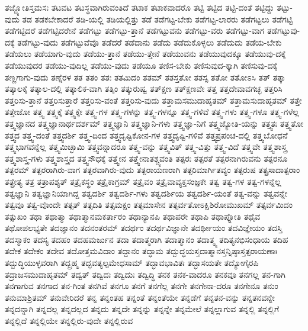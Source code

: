 {ತಜ್ಜ್ಯೋತಿಸ್ತಮಸಃ
ತಟವಟ
ತಟಸ್ಥವಾಗಿರುವಂತಿದೆ
ತಟಾಕ
ತಟಾಕವಾದರೊ
ತಟ್ಟಿ
ತಟ್ಟಿದ
ತಟ್ಟಿ-ದಂತೆ
ತಟ್ಟಿದ್ದು
ತಟ್ಟು-ವುದು
ತಡ
ತಡಕಬೇಕಾದರೆ
ತಡಿ-ಯಲ್ಲಿ
ತಡಿಯಲ್ಲಿತ್ತು
ತಡೆ
ತಡೆಗಟ್ಟ-ಬೇಕು
ತಡೆಗಟ್ಟ-ಲಾರರು
ತಡೆಗಟ್ಟಲು
ತಡೆಗಟ್ಟಿ
ತಡೆಗಟ್ಟಿದರೆ
ತಡೆಗಟ್ಟಿದರೇನೆ
ತಡೆಗಟ್ಟು
ತಡೆಗಟ್ಟು-ತ್ತಾನೆ
ತಡೆಗಟ್ಟುವನು
ತಡೆಗಟ್ಟು-ವರು
ತಡೆಗಟ್ಟು-ವಾಗ
ತಡೆಗಟ್ಟುವು-ದಕ್ಕೆ
ತಡೆಗಟ್ಟು-ವುದು
ತಡೆಗಟ್ಟುವೆವೊ
ತಡೆದರೆ
ತಡೆದಾನು
ತಡೆದು
ತಡೆದುಕೊಳ್ಳಲು
ತಡೆದುದು
ತಡೆಯ-ಬೇಕು
ತಡೆಯಲು
ತಡೆಯಾಗು-ವುದು
ತಡೆಯು-ತ್ತಾನೆ
ತಡೆಯು-ತ್ತೇನೆ
ತಡೆಯುವನು
ತಡೆಯುವುದಕ್ಕೂ
ತಡೆಯುವು-ದಕ್ಕೆ
ತಡೆಯುವುದರ
ತಡೆಯು-ವುದಿಲ್ಲ
ತಡೆಯು-ವುದು
ತಡೆಯೂ
ತಣಿಸ-ಬೇಕು
ತಣಿಸುವುದ-ಕ್ಕಾಗಿ
ತಣಿಸುವು-ದಕ್ಕೆ
ತಣ್ಣಗಾಗು-ವುದು
ತಣ್ನೆರಳ
ತತ
ತತಂ
ತತಃ
ತತಮಿದಂ
ತತಮ್
ತತಸ್ತತೋ
ತತಸ್ಸ
ತತೋ
ತತೋಽಸಿ
ತತ್
ತತ್ಕಾ
ತತ್ಕಾಲಕ್ಕೆ
ತತ್ಕಾಲ-ದಲ್ಲಿ
ತತ್ಕಾಲಿಕ-ವಾಗಿ
ತತ್ಕಿಂ
ತತ್ಕುರುಷ್ವ
ತತ್ಕ್ಷಣ
ತತ್ಕ್ಷಣವೇ
ತತ್ತ
ತತ್ತದೇವಾವಗಚ್ಛ
ತತ್ತರಿಸಿ
ತತ್ತರಿಸು-ತ್ತಾನೆ
ತತ್ತರಿಸುತ್ತಾರೆ
ತತ್ತರಿಸು-ವಂತೆ
ತತ್ತರಿಸು-ವುದು
ತತ್ತಾಮಸಮುದಾಹೃತಮ್
ತತ್ತಾಮಸುದಾಹೃತಮ್
ತತ್ತೇ
ತತ್ತೇಜೋ
ತತ್ತ್ವ
ತತ್ತ್ವಕ್ಕೆ
ತತ್ತ್ವಕ್ಕೇ
ತತ್ತ್ವ-ಗಳ
ತತ್ತ್ವ-ಗಳನ್ನು
ತತ್ತ್ವ-ಗಳನ್ನೂ
ತತ್ತ್ವ-ಗಳಿವೆ
ತತ್ತ್ವ-ಗಳು
ತತ್ತ್ವ-ಗಳೂ
ತತ್ತ್ವ-ಗಳೆಲ್ಲ
ತತ್ತ್ವಜ್ಞಾನದ
ತತ್ತ್ವಜ್ಞಾನಾರ್ಥದರ್ಶಮ್
ತತ್ತ್ವಜ್ಞಾನಿ
ತತ್ತ್ವಜ್ಞಾನಿ-ಗಳು
ತತ್ತ್ವಜ್ಞಾ-ನಿಗೆ
ತತ್ತ್ವಜ್ಯೋತಿ-ಯನ್ನು
ತತ್ತ್ವತಃ
ತತ್ತ್ವತೋ
ತತ್ತ್ವದ
ತತ್ತ್ವ-ದಂತೆ
ತತ್ತ್ವದರ್ಶಿ
ತತ್ತ್ವ-ದಿಂದ
ತತ್ತ್ವದೃಷ್ಟಿಕೋನ-ಗಳ
ತತ್ತ್ವದೃಷ್ಟಿ-ಗಳಿವೆ
ತತ್ತ್ವಪ್ರಪಂಚ-ದಲ್ಲಿ
ತತ್ತ್ವಬೋಧನೆ
ತತ್ತ್ವಭಾಗವನ್ನೆಲ್ಲ
ತತ್ತ್ವಮಿಚ್ಛಾಮಿ
ತತ್ತ್ವವನ್ನಾದರೂ
ತತ್ತ್ವ-ವನ್ನು
ತತ್ತ್ವವಿತ್
ತತ್ತ್ವ-ವಿತ್ತು
ತತ್ತ್ವ-ವಿದೆ
ತತ್ತ್ವವೇ
ತತ್ತ್ವಶಾಸ್ತ್ರ
ತತ್ತ್ವಶಾಸ್ತ್ರ-ಗಳು
ತತ್ತ್ವಶಾಸ್ತ್ರದ
ತತ್ತ್ವಸೌಧಕ್ಕೆ
ತತ್ತ್ವೇನ
ತತ್ತ್ವೇನಾತಶ್ಚ್ಯವಂತಿ
ತತ್ಪರಃ
ತತ್ಪರತೆ
ತತ್ಪರನಾಗಿರುವನು
ತತ್ಪರನೂ
ತತ್ಪರಮ್
ತತ್ಪರರಾಗಿರು-ವಾಗ
ತತ್ಪರವಾಗಿರು-ವುದು
ತತ್ಪರಾಯಣರಾಗಿ
ತತ್ಪರಿಮಾರ್ಗಿತವ್ಯಂ
ತತ್ಪರುಷ
ತತ್ಪ್ರಸಾದಾತ್ಪರಾಂ
ತತ್ಪ್ರೇತ್ಯ
ತತ್ರ
ತತ್ರಾಪಶ್ಯತ್
ತತ್ರೈಕಸ್ಥಂ
ತತ್ರೈಕಾಗ್ರಮ್
ತತ್ರೈವಂ
ತತ್ರೈವಾವ್ಯಕ್ತಸಂಜ್ಞಕೇ
ತತ್ವ
ತತ್ವ-ಗಳ
ತತ್ವ-ಗಳನ್ನೆಲ್ಲ
ತತ್ವಜ್ಞಾನಿ
ತತ್ವಜ್ಞಾನಿಯಾಗಿದ್ದ
ತತ್ವದರ್ಶಿ
ತತ್ವದರ್ಶಿ-ಗಳು
ತತ್ವದರ್ಶಿಯ
ತತ್ವದರ್ಶಿ-ಯಂತೆ
ತತ್ವ-ವನ್ನು
ತತ್ವವನ್ನೇ
ತತ್ವವೂ
ತತ್ವ-ವೊಂದೇ
ತತ್ಸತ್
ತತ್ಸದಿತಿ
ತತ್ಸಮಕ್ಷಂ
ತತ್ಸಮಾಸೇನ
ತತ್ಸರ್ವತೋಽಕ್ಷಿಶಿರೋಮುಖಮ್
ತತ್ಸರ್ವಮಿದಂ
ತತ್ಸುಖಂ
ತಥಾ
ತಥಾತ್ಮಾ
ತಥಾತ್ಮಾನಮಕರ್ತಾರಂ
ತಥಾನ್ಯಾನಪಿ
ತಥಾಪರೇ
ತಥಾಪಿ
ತಥಾಪ್ನೋತಿ
ತಥೈವ
ತಥೋಪಲಭ್ಯತೇ
ತದಜ್ಞಾನಂ
ತದನಂತರಮ್
ತದರ್ಥಂ
ತದರ್ಥವಿಜ್ಞಾನೇ
ತದರ್ಥೀಯಂ
ತದವಿಜ್ಞೇಯಂ
ತದಸ್ತಿ
ತದಸ್ಮಾಕಂ
ತದಸ್ಯ
ತದಹಂ
ತದಹಮರ್ಜುನ
ತದಾ
ತದಾತ್ಮರಾಗಿ
ತದಾತ್ಮಾನಂ
ತದಾತ್ಮ್ಯ
ತದಿತ್ಯನಭಿಸಂಧಾಯ
ತದಿಹ
ತದೇಕ
ತದೇಕಂ
ತದೇವ
ತದೋತ್ತಮವಿದಾಂ
ತದ್ದಾನಂ
ತದ್ಧಾಮ
ತದ್ಬುದ್ಧಯಸ್ತದಾತ್ಮಾನಸ್ತನ್ನಿಷ್ಠಾಸ್ತತ್ಪರಾಯಣಾಃ
ತದ್ಬುದ್ಧಿಯುಳ್ಳವರಾಗಿ
ತದ್ಬ್ರಹ್ಮ
ತದ್ಭವತ್ಯಲ್ಪಮೇಧಸಾಮ್
ತದ್ಭಾವಭಾವಿತಃ
ತದ್ಭಾಸಯತೇ
ತದ್ಯೋಗೈರಪಿ
ತದ್ರಾಜಸಮುದಾಹೃತಮ್
ತದ್ವತ್
ತದ್ವಿದಃ
ತದ್ವಿದುಃ
ತದ್ವಿದ್ಧಿ
ತನಕ
ತನಕ-ವಾದರೂ
ತನಕವೂ
ತನಗಲ್ಲ
ತನ-ಗಾಗಿ
ತನಗಾಗುವ
ತನಗಾದ
ತನ-ಗಿಂತ
ತನಗಿವೆ
ತನಗೂ
ತನಗೆ
ತನಗೆಲ್ಲ
ತನಗೇ
ತನಗೇನಾ-ದರೂ
ತನಗೇನೂ
ತನುಂ
ತನುಮಾಶ್ರಿತಮ್
ತನುವೇರಿದರೆ
ತನ್ನ
ತನ್ನಂತಹ
ತನ್ನಂತೆ
ತನ್ನಂತೆಯೇ
ತನ್ನಡೆಗೆ
ತನ್ನತನ-ವನ್ನು
ತನ್ನತನವನ್ನೇ
ತನ್ನದನ್ನಾಗಿ
ತನ್ನದಲ್ಲ
ತನ್ನದಲ್ಲದ
ತನ್ನದು
ತನ್ನದೇ
ತನ್ನನ್ನು
ತನ್ನನ್ನೇ
ತನ್ನಮೇಲೆ
ತನ್ನಲ್ಲಾಗುವ
ತನ್ನಲ್ಲಿ
ತನ್ನಲ್ಲಿಗೆ
ತನ್ನಲ್ಲಿದೆ
ತನ್ನಲ್ಲಿಯೇ
ತನ್ನಲ್ಲಿರು-ವುದೇ
ತನ್ನಲ್ಲಿರುವ
}
